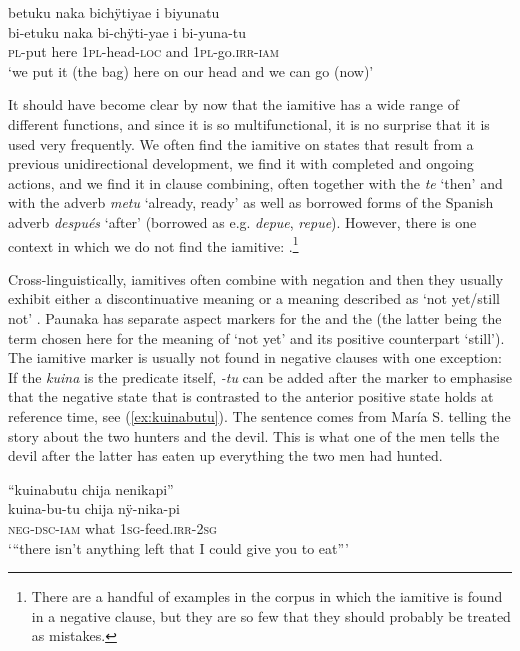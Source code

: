 \ea\label{ex:predicate2}
\begingl 
\glpreamble betuku naka bichÿtiyae i biyunatu\\
\gla bi-etuku naka bi-chÿti-yae i bi-yuna-tu\\ 
\textsc{pl}-put here 1\textsc{pl}-head-\textsc{loc} and 1\textsc{pl}-go.\textsc{irr}-\textsc{iam}\\ 
\glft ‘we put it (the bag) here on our head and we can go (now)’
\trailingcitation{[jmx-d110918ls-2.02-03]}
\xe

It should have become clear by now that the iamitive has a wide range of different functions, and since it is so multifunctional, it is no surprise that it is used very frequently. We often find the iamitive on states that result from a previous unidirectional development, we find it with completed and ongoing actions, and we find it in clause combining, often together with the   \textit{te} ‘then’ and with the adverb \textit{metu} ‘already, ready’ as well as borrowed forms of the Spanish adverb \textit{después} ‘after’ (borrowed as e.g. \textit{depue}, \textit{repue}). However, there is one context in which we do not find the iamitive: .\footnote{There are a handful of examples in the corpus in which the iamitive is found in a negative clause, but they are so few that they should probably be treated as mistakes.} 

Cross-linguistically, iamitives often combine with negation and then they usually exhibit either a discontinuative meaning or a meaning described as ‘not yet/still not’ \citep[cf.][35--36]{Olsson2013}. Paunaka  has separate aspect markers for the  and the  (the latter being the term chosen here for the meaning of ‘not yet’ and its positive counterpart ‘still’). The iamitive marker is usually not found in negative clauses with one exception: If the  \textit{kuina} is the predicate itself, \textit{-tu} can be added after the  marker to emphasise that the negative state that is contrasted to the anterior positive state holds at reference time, see (\ref{ex:kuinabutu}). The sentence comes from María S. telling the story about the two hunters and the devil. This is what one of the men tells the devil after the latter has eaten up everything the two men had hunted.

 \ea\label{ex:kuinabutu}
\begingl
\glpreamble “kuinabutu chija nenikapi”\\
\gla kuina-bu-tu chija nÿ-nika-pi\\
\glb \textsc{neg}-\textsc{dsc}-\textsc{iam} what 1\textsc{sg}-feed.\textsc{irr}-2\textsc{sg}\\
\glft ‘“there isn’t anything left that I could give you to eat”’
\endgl
\trailingcitation{[rxx-n120511l-2.45-46]}
\xe

